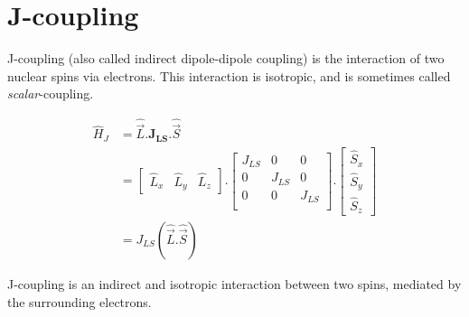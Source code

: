 \documentclass[11pt]{article}
\theoremstyle{definition}
\begin{document}
\section{J-coupling}
J-coupling (also called indirect dipole-dipole coupling) is the interaction of two nuclear spins via electrons. This interaction is isotropic, and is sometimes called \emph{scalar}-coupling.

\begin{align}
	\hat H_J &= \hat{\vec L}.\mathbf{J_{LS}}.\hat{\vec S} \\ 
	&=
	\begin{bmatrix}
		\hat L_x & \hat L_y & \hat L_z
	\end{bmatrix}.
	\begin{bmatrix}
		J_{LS} & 0 & 0\\
		0 & J_{LS} & 0\\
		0 & 0 & J_{LS}\\
	\end{bmatrix}.
	\begin{bmatrix}
		\hat S_x \\
		\hat S_y \\
		\hat S_z
	\end{bmatrix}\\
	&= J_{LS}(\hat{\vec L}.\hat{\vec S})
\end{align}

\begin{shaded}
	J-coupling is an indirect and isotropic interaction between two spins, mediated by the surrounding electrons.
\end{shaded}




% 
% 
% 
% 
\end{document}

